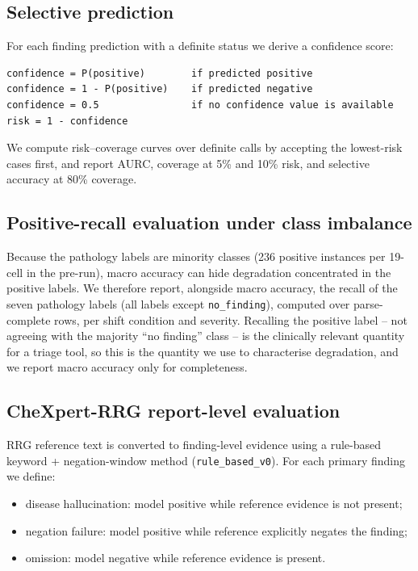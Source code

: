\subsection{Selective prediction}

For each finding prediction with a definite status we derive a confidence score:

\begin{verbatim}
confidence = P(positive)        if predicted positive
confidence = 1 - P(positive)    if predicted negative
confidence = 0.5                if no confidence value is available
risk = 1 - confidence
\end{verbatim}

We compute risk--coverage curves over definite calls by accepting the lowest-risk cases first, and report AURC, coverage at 5\% and 10\% risk, and selective accuracy at 80\% coverage.

\subsection{Positive-recall evaluation under class imbalance}

Because the pathology labels are minority classes (236 positive instances per
19-cell in the pre-run), macro accuracy can hide degradation concentrated in the
positive labels. We therefore report, alongside macro accuracy, the recall of the
seven pathology labels (all labels except \texttt{no\_finding}), computed over
parse-complete rows, per shift condition and severity. Recalling the positive
label -- not agreeing with the majority ``no finding'' class -- is the
clinically relevant quantity for a triage tool, so this is the quantity we use to
characterise degradation, and we report macro accuracy only for completeness.

\subsection{CheXpert-RRG report-level evaluation}

RRG reference text is converted to finding-level evidence using a rule-based keyword + negation-window method (\texttt{rule\_based\_v0}). For each primary finding we define:

\begin{itemize}
\item disease hallucination: model positive while reference evidence is not present;
\item negation failure: model positive while reference explicitly negates the finding;
\item omission: model negative while reference evidence is present.
\end{itemize}


